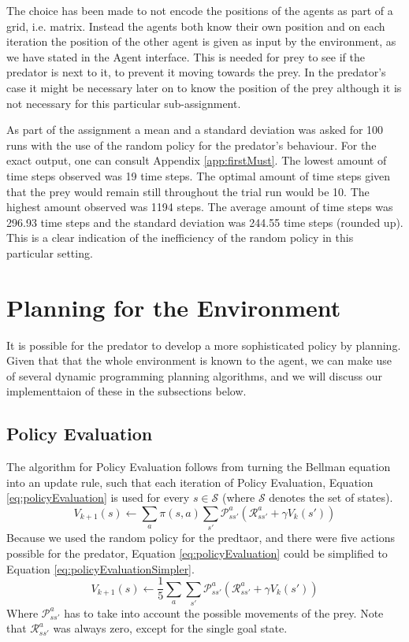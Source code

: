 \documentclass{article}
\begin{document}
The choice has been made to not encode the positions of the agents as part of a grid, i.e. matrix. Instead the agents both know their own position and on each iteration the position of the other agent is given as input by the environment, as we have stated in the Agent interface. This is needed for prey to see if the predator is next to it, to prevent it moving towards the prey. In the predator's case it might be necessary later on to know the position of the prey although it is not necessary for this particular sub-assignment.

As part of the assignment a mean and a standard deviation was asked for 100 runs with the use of the random policy for the predator's behaviour. For the exact output, one can consult Appendix \ref{app:firstMust}. The lowest amount of time steps observed was 19 time steps. The optimal amount of time steps given that the prey would remain still throughout the trial run would be 10. The highest amount observed was 1194 steps. The average amount of time steps was 296.93 time steps and the standard deviation was 244.55 time steps (rounded up). This is a clear indication of the inefficiency of the random policy in this particular setting. 


\section{Planning for the Environment}
It is possible for the predator to develop a more sophisticated policy by planning. Given that that the whole environment is known to the agent, we can make use of several dynamic programming planning algorithms, and we will discuss our implementtaion of these in the subsections below.

\subsection{ Policy Evaluation}
The algorithm for Policy Evaluation follows from turning the Bellman equation into an update rule, such that each iteration of Policy Evaluation, Equation \ref{eq:policyEvaluation} is used for every $s \in \mathcal S$ (where $\mathcal S$ denotes the set of states).
\begin{equation}\label{eq:policyEvaluation}
V_{k+1}(s) \leftarrow \sum_{a} \pi (s,a) \sum_{s'}  \mathcal P_{s s'}^{a} \left( \mathcal R_{s s'}^{a} 
+ \gamma V_{k}(s') \right) 
\end{equation}
Because we used the random policy for the predtaor, and there were five actions possible for the predator, Equation \ref{eq:policyEvaluation} could be simplified to Equation \ref{eq:policyEvaluationSimpler}.
\begin{equation}\label{eq:policyEvaluationSimpler}
V_{k+1}(s) \leftarrow \frac{1}{5} \sum_{a}  \sum_{s'}  \mathcal P_{s s'}^{a} \left( \mathcal R_{s s'}^{a} 
+ \gamma V_{k}(s') \right) 
\end{equation}
Where $\mathcal P_{s s'}^{a}$ has to take into account the possible movements of the prey. Note that $\mathcal R_{s s'}^{a}$ was always zero, except for the single goal state.
\end{document}

